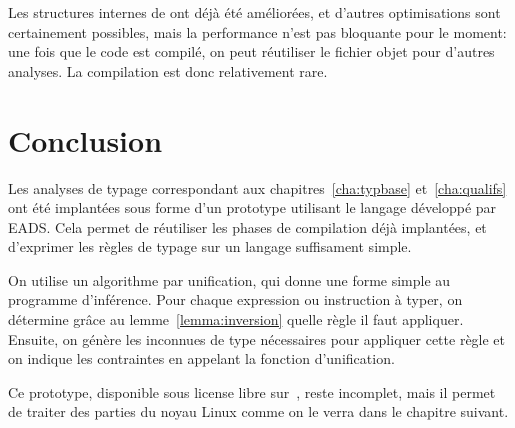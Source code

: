 
Les structures internes de \ctonewspeak ont déjà été améliorées, et d'autres
optimisations sont certainement possibles, mais la performance n'est pas
bloquante pour le moment: une fois que le code est compilé, on peut réutiliser
le fichier objet \newspeak pour d'autres analyses. La compilation est donc
relativement rare.

\section*{Conclusion}

Les analyses de typage correspondant aux chapitres~\ref{cha:typbase}
et~\ref{cha:qualifs} ont été implantées sous forme d'un prototype utilisant le
langage \newspeak développé par EADS. Cela permet de réutiliser les phases de
compilation déjà implantées, et d'exprimer les règles de typage sur un langage
suffisament simple.


On utilise un algorithme par unification, qui donne une forme simple au
programme d'inférence. Pour chaque expression ou instruction à typer, on
détermine grâce au lemme~\ref{lemma:inversion} quelle règle il faut appliquer.
Ensuite, on génère les inconnues de type nécessaires pour appliquer cette règle
et on indique les contraintes en appelant la fonction d'unification.

Ce prototype, disponible sous license libre sur~, reste incomplet,
mais il permet de traiter des parties du noyau Linux comme on le verra dans le
chapitre suivant.


